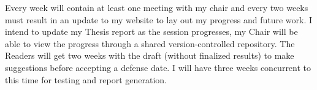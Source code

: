 Every week will contain at least one meeting with my chair and every two weeks
must result in an update to my website to lay out my progress and future work. 
I intend to update my Thesis report as the session progresses, my Chair will be 
able to view the progress through a shared version-controlled repository. The
Readers will get two weeks with the draft (without finalized results) to make
suggestions before accepting a defense date. I will have three weeks concurrent
to this time for testing and report generation.


\pagebreak{}

\singlespacing




